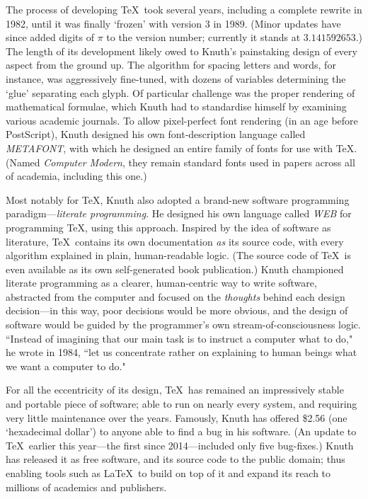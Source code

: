 \documentclass[12pt]{article}
\begin{document}
	The process of developing \TeX\ took several years, including a complete rewrite in 1982, until it was finally `frozen' with version 3 in 1989. (Minor updates have since added digits of $\pi$ to the version number; currently it stands at $3.141592653$.) The length of its development likely owed to Knuth's painstaking design of every aspect from the ground up. The algorithm for spacing letters and words, for instance, was aggressively fine-tuned, with dozens of variables determining the `glue' separating each glyph. Of particular challenge was the proper rendering of mathematical formulae, which Knuth had to standardise himself by examining various academic journals. To allow pixel-perfect font rendering (in an age before PostScript), Knuth designed his own font-description language called \textsl{METAFONT}, with which he designed an entire family of fonts for use with \TeX. (Named \textit{Computer Modern}, they remain standard fonts used in papers across all of academia, including this one.)
	
	Most notably for \TeX, Knuth also adopted a brand-new software programming para\-digm---\textit{literate programming}. He designed his own language called \textsl{WEB} for programming \TeX, using this approach. Inspired by the idea of software as literature, \TeX\ contains its own documentation \textit{as} its source code, with every algorithm explained in plain, human-readable logic. (The source code of \TeX\ is even available as its own self-generated book publication.) Knuth championed literate programming as a clearer, human-centric way to write software, abstracted from the computer and focused on the \textit{thoughts} behind each design decision---in this way, poor decisions would be more obvious, and the design of software would be guided by the programmer's own stream-of-consciousness logic. ``Instead of imagining that our main task is to instruct a computer what to do," he wrote in 1984, ``let us concentrate rather on explaining to human beings what we want a computer to do."
	
	For all the eccentricity of its design, \TeX\ has remained an impressively stable and portable piece of software; able to run on nearly every system, and requiring very little maintenance over the years. Famously, Knuth has offered \$2.56 (one `hexadecimal dollar') to anyone able to find a bug in his software. (An update to \TeX\ earlier this year---the first since 2014---included only five bug-fixes.) Knuth has released it as free software, and its source code to the public domain; thus enabling tools such as \LaTeX\ to build on top of it and expand its reach to millions of academics and publishers.
	
\end{document}
